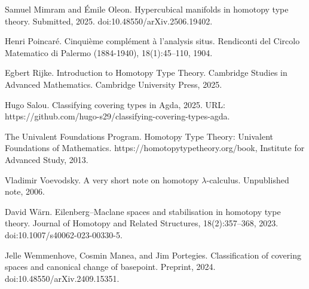 \par\noindent  [10]  Samuel Mimram and Émile Oleon.  Hypercubical manifolds in homotopy type theory.  Submitted, 2025.  doi:10.48550/arXiv.2506.19402.  
 
\par\noindent  [11]  Henri Poincaré.  Cinquième complément à l’analysis situs.  Rendiconti del Circolo Matematico di Palermo (1884-1940), 18(1):45–110, 1904.  
 
\par\noindent  [12]  Egbert Rijke.  Introduction to Homotopy Type Theory.  Cambridge Studies in Advanced Mathematics. Cambridge University Press, 2025.  
 
\par\noindent  [13]  Hugo Salou.  Classifying covering types in Agda, 2025.  URL: https://github.com/hugo-s29/classifying-covering-types-agda.  
 
\par\noindent  [14]  The Univalent Foundations Program.  Homotopy Type Theory: Univalent Foundations of Mathematics.  https://homotopytypetheory.org/book, Institute for Advanced Study, 2013.  
 
\par\noindent  [15]  Vladimir Voevodsky.  A very short note on homotopy $\lambda$-calculus.  Unpublished note, 2006.  
 
\par\noindent  [16]  David Wärn.  Eilenberg–Maclane spaces and stabilisation in homotopy type theory.  Journal of Homotopy and Related Structures, 18(2):357–368, 2023.  doi:10.1007/s40062-023-00330-5.  
 
\par\noindent  [17]  Jelle Wemmenhove, Cosmin Manea, and Jim Portegies.  Classification of covering spaces and canonical change of basepoint.  Preprint, 2024.  doi:10.48550/arXiv.2409.15351.  
  
